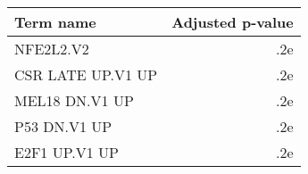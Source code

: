 \begin{tabular}{lr}
\toprule
        Term name &  Adjusted p-value \\
\midrule
        NFE2L2.V2 &               .2e \\
CSR LATE UP.V1 UP &               .2e \\
   MEL18 DN.V1 UP &               .2e \\
     P53 DN.V1 UP &               .2e \\
    E2F1 UP.V1 UP &               .2e \\
\bottomrule
\end{tabular}
